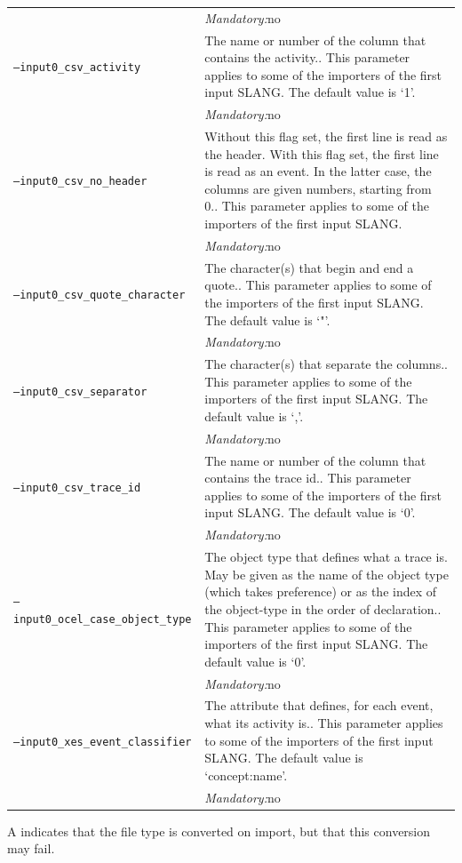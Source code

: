 {\begin{tabularx}{\linewidth}{lX}
&\textit{Mandatory:}\quad no\\
\texttt{--input0\_csv\_activity} & The name or number of the column that contains the activity.. This parameter applies to some of the importers of the first input SLANG. The default value is `1'.\\
&\textit{Mandatory:}\quad no\\
\texttt{--input0\_csv\_no\_header} & Without this flag set, the first line is read as the header. 
    With this flag set, the first line is read as an event. In the latter case, the columns are given numbers, starting from 0.. This parameter applies to some of the importers of the first input SLANG. \\
&\textit{Mandatory:}\quad no\\
\texttt{--input0\_csv\_quote\_character} & The character(s) that begin and end a quote.. This parameter applies to some of the importers of the first input SLANG. The default value is `"'.\\
&\textit{Mandatory:}\quad no\\
\texttt{--input0\_csv\_separator} & The character(s) that separate the columns.. This parameter applies to some of the importers of the first input SLANG. The default value is `,'.\\
&\textit{Mandatory:}\quad no\\
\texttt{--input0\_csv\_trace\_id} & The name or number of the column that contains the trace id.. This parameter applies to some of the importers of the first input SLANG. The default value is `0'.\\
&\textit{Mandatory:}\quad no\\
\texttt{--input0\_ocel\_case\_object\_type} & The object type that defines what a trace is. May be given as the name of the object type (which takes preference) or as the index of the object-type in the order of declaration.. This parameter applies to some of the importers of the first input SLANG. The default value is `0'.\\
&\textit{Mandatory:}\quad no\\
\texttt{--input0\_xes\_event\_classifier} & The attribute that defines, for each event, what its activity is.. This parameter applies to some of the importers of the first input SLANG. The default value is `concept:name'.\\
&\textit{Mandatory:}\quad no\\
\bottomrule
\end{tabularx}
A \textdagger{} indicates that the file type is converted on import, but that this conversion may fail.
}
